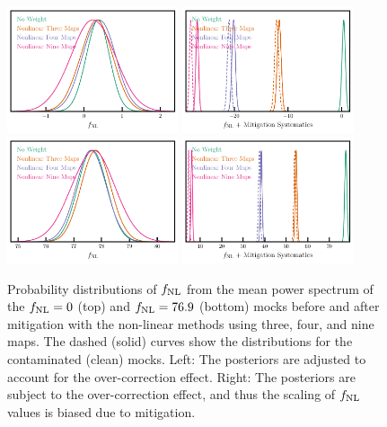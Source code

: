 \begin{figure}
\centering
\includegraphics[width=0.45\textwidth]{figures/mcmc_cont.pdf}
\includegraphics[width=0.45\textwidth]{figures/mcmc_contnoshift.pdf}
\includegraphics[width=0.45\textwidth]{figures/mcmcp_cont.pdf}
\includegraphics[width=0.45\textwidth]{figures/mcmcp_contnoshift.pdf}
\caption{Probability distributions of $f_{\rm NL}$ from the mean power spectrum of the $f_{\rm NL}=0$ (top) and $f_{\rm NL}=76.9$ (bottom) mocks before and after mitigation with the non-linear methods using three, four, and nine maps. The dashed (solid) curves show the distributions for the contaminated (clean) mocks. Left: The posteriors are adjusted to account for the over-correction effect. Right: The posteriors are subject to the over-correction effect, and thus the scaling of $f_{\rm NL}$ values is biased due to mitigation.}\label{fig:contmcmc}
\end{figure}


